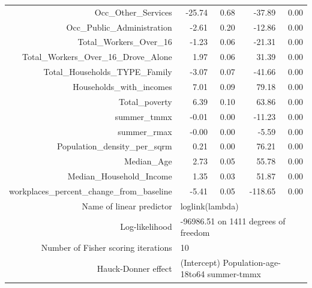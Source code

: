 \documentclass[
]{article}
\begin{document}
\begin{table}[ht]
\begin{tabular}{rrrrr}
$$  Occ\_Other\_Services & -25.74 & 0.68 & -37.89 & 0.00 \\ 
  Occ\_Public\_Administration & -2.61 & 0.20 & -12.86 & 0.00 \\ 
  Total\_Workers\_Over\_16 & -1.23 & 0.06 & -21.31 & 0.00 \\ 
  Total\_Workers\_Over\_16\_Drove\_Alone & 1.97 & 0.06 & 31.39 & 0.00 \\ 
  Total\_Households\_TYPE\_Family & -3.07 & 0.07 & -41.66 & 0.00 \\ 
  Households\_with\_incomes & 7.01 & 0.09 & 79.18 & 0.00 \\ 
  Total\_poverty & 6.39 & 0.10 & 63.86 & 0.00 \\ 
  summer\_tmmx & -0.01 & 0.00 & -11.23 & 0.00 \\ 
  summer\_rmax & -0.00 & 0.00 & -5.59 & 0.00 \\ 
  Population\_density\_per\_sqrm & 0.21 & 0.00 & 76.21 & 0.00 \\ 
  Median\_Age & 2.73 & 0.05 & 55.78 & 0.00 \\ 
  Median\_Household\_Income & 1.35 & 0.03 & 51.87 & 0.00 \\ 
  workplaces\_percent\_change\_from\_baseline & -5.41 & 0.05 & -118.65 & 0.00 \\ 
  \hline
 \multicolumn{1}{r}{Name of linear predictor} & \multicolumn{4}{l}{loglink(lambda)}\\
 \multicolumn{1}{r}{Log-likelihood} & \multicolumn{4}{l}{-96986.51 on 1411 degrees of freedom} \\
 \multicolumn{1}{r}{Number of Fisher scoring iterations} & \multicolumn{4}{l}{10} \\
 \multicolumn{1}{r}{Hauck-Donner effect} & \multicolumn{4}{l}{(Intercept)  Population-age-18to64 summer-tmmx} \\
\hline
   
\end{tabular}
\end{table}

\newpage

\hypertarget{section}{%
\subsection{}\label{section}}

\newpage
\end{document}
